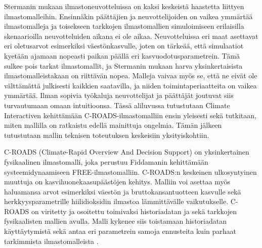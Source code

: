 \documentclass[finnish,12pt,a4paper,pdftex]{article}
\begin{document}
\begin{onehalfspacing}
Stermanin \cite{CroadsFlightSimulator2011} mukaan ilmastoneuvotteluissa on kaksi keskeistä haastetta liittyen ilmastomalleihin. Ensinnäkin päättäjien ja neuvottelijoiden on vaikea ymmärtää ilmastomalleja ja toisekseen tarkkojen ilmastomallien simuloimiseen erilaisilla skenaarioilla neuvotteluiden aikana ei ole aikaa. Neuvotteluissa eri maat asettavat eri oletusarvot esimerkiksi väestönkasvulle, joten on tärkeää, että simulaatiot kyetään ajamaan nopeasti paikan päällä eri kasvuodotusparametrein. Tämä sulkee pois tarkat ilmastomallit, ja Stermanin \cite{CroadsFlightSimulator2011} mukaan harva yksinkertaisista ilmastomalleistakaan on riittävän nopea. Malleja vaivaa myös se, että ne eivät ole välttämättä julkisesti kaikkien saatavilla, ja niiden toimintaperiaatteita on vaikea ymmärtää. Ilman sopivia työkaluja neuvottelijat ja päättäjät joutuvat siis turvautumaan omaan intuitioonsa. Tässä aliluvussa tutustutaan Climate Interactiven kehittämään C-ROADS-ilmastomalliin ensin yleisesti sekä tutkitaan, miten mallilla on ratkaistu edellä mainittuja ongelmia. Tämän jälkeen tutustutaan mallin teknisen toteutuksen keskeisiin yksityiskohtiin. 

C-ROADS (Climate-Rapid Overview And Decision Support) on yksinkertainen fysikaalinen ilmastomalli, joka perustuu Fiddamanin \cite{Fiddaman1997} kehittämään systeemidynaamiseen FREE-ilmastomalliin. C-ROADS:n keskeinen ulkosyntyinen muuttuja on kasvihuonekaasupäästöjen kehitys. Malliin voi asettaa myös haluamansa arvot esimerkiksi väestön ja bruttokansantuotteen kasvulle sekä herkkyysparametrille hiilidioksidin ilmastoa lämmittävälle vaikutukselle. \cite{CroadsFlightSimulator2011, Croads} C-ROADS on viritetty ja osoitettu toimivaksi historiadatan ja sekä tarkkojen fysikaalisten mallien avulla. Malli kykenee siis toistamaan historiadatan käyttäytymistä sekä antaa eri parametrein samoja ennusteita kuin parhaat tarkimmista ilmastomalleista  \cite{CroadsWWW, CroadsFlightSimulator2011}.


\end{onehalfspacing}
\end{document}
